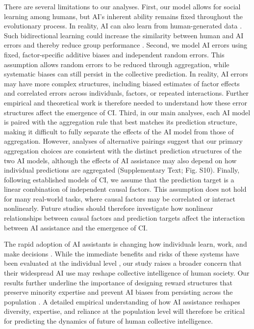 \documentclass[12pt]{article}
\begin{document}
There are several limitations to our analyses.
First, our model allows for social learning among humans, but AI's inherent ability remains fixed throughout the evolutionary process.
In reality, AI can also learn from human-generated data \citep{ouyang2022training}.
Such bidirectional learning could increase the similarity between human and AI errors and thereby reduce group performance \citep{glickman2025human}.
Second, we model AI errors using fixed, factor-specific additive biases and independent random errors.
This assumption allows random errors to be reduced through aggregation, while systematic biases can still persist in the collective prediction.
In reality, AI errors may have more complex structures, including biased estimates of factor effects and correlated errors across individuals, factors, or repeated interactions.
Further empirical and theoretical work is therefore needed to understand how these error structures affect the emergence of CI.
Third, in our main analyses, each AI model is paired with the aggregation rule that best matches its prediction structure, making it difficult to fully separate the effects of the AI model from those of aggregation. 
However, analyses of alternative pairings suggest that our primary aggregation choices are consistent with the distinct prediction structures of the two AI models, although the effects of AI assistance may also depend on how individual predictions are aggregated  (Supplementary Text; Fig. S10).
Finally, following established models of CI, we assume that the prediction target is a linear combination of independent causal factors.
This assumption does not hold for many real-world tasks, where causal factors may be correlated or interact nonlinearly.
Future studies should therefore investigate how nonlinear relationships between causal factors and prediction targets affect the interaction between AI assistance and the emergence of CI.

The rapid adoption of AI assistants is changing how individuals learn, work, and make decisions \citep{tessler2024ai,glickman2025human,sajadieh2026artificial,bick2026rapid,ke2026ai}.
While the immediate benefits and risks of these systems have been evaluated at the individual level \citep{noy2023experimental,bastani2025generative}, our study raises a broader concern that their widespread AI use may reshape collective intelligence of human society.
Our results further underline the importance of designing reward structures that preserve minority expertise and prevent AI biases from persisting across the population \citep{mann2017optimal,vicente2023humans,glickman2025human,wang2025individual}.
A detailed empirical understanding of how AI assistance reshapes diversity, expertise, and reliance at the population level will therefore be critical for predicting the dynamics of future of human collective intelligence.
\end{document}
